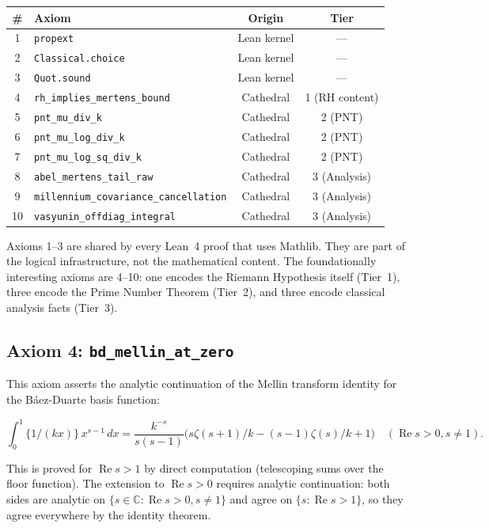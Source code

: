 \documentclass[11pt,a4paper]{article}
\theoremstyle{plain}
\theoremstyle{definition}
\newcommand{\lean}[1]{\texttt{#1}}
\newcommand{\CC}{\mathbb{C}}
\newcommand{\re}{\operatorname{Re}}
\begin{document}
\begin{center}
\begin{tabular}{@{}clcc@{}}
\toprule
\textbf{\#} & \textbf{Axiom} & \textbf{Origin} & \textbf{Tier} \\
\midrule
1 & \lean{propext} & Lean kernel & --- \\
2 & \lean{Classical.choice} & Lean kernel & --- \\
3 & \lean{Quot.sound} & Lean kernel & --- \\
4 & \lean{rh\_implies\_mertens\_bound} & Cathedral & 1 (RH content) \\
5 & \lean{pnt\_mu\_div\_k} & Cathedral & 2 (PNT) \\
6 & \lean{pnt\_mu\_log\_div\_k} & Cathedral & 2 (PNT) \\
7 & \lean{pnt\_mu\_log\_sq\_div\_k} & Cathedral & 2 (PNT) \\
8 & \lean{abel\_mertens\_tail\_raw} & Cathedral & 3 (Analysis) \\
9 & \lean{millennium\_covariance\_cancellation} & Cathedral & 3 (Analysis) \\
10 & \lean{vasyunin\_offdiag\_integral} & Cathedral & 3 (Analysis) \\
\bottomrule
\end{tabular}
\end{center}

Axioms 1--3 are shared by every Lean~4 proof that uses Mathlib.
They are part of the logical infrastructure, not the mathematical
content. The foundationally interesting axioms are 4--10: one encodes
the Riemann Hypothesis itself (Tier~1), three encode the Prime Number
Theorem (Tier~2), and three encode classical analysis facts (Tier~3).

\subsection{Axiom 4: \lean{bd\_mellin\_at\_zero}}

This axiom asserts the analytic continuation of the Mellin transform
identity for the B\'aez-Duarte basis function:

\[
  \int_0^1 \{1/(kx)\}\,x^{s-1}\,dx = \frac{k^{-s}}{s(s-1)}
  \bigl(s\zeta(s+1)/k - (s-1)\zeta(s)/k + 1\bigr)
  \quad (\re s > 0, s \neq 1).
\]

This is proved for $\re s > 1$ by direct computation (telescoping
sums over the floor function). The extension to $\re s > 0$ requires
analytic continuation: both sides are analytic on $\{s \in \CC :
\re s > 0, s \neq 1\}$ and agree on $\{s : \re s > 1\}$, so they
agree everywhere by the identity theorem.
\end{document}
